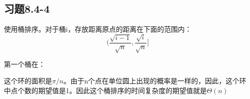 \documentclass[a4paper, 11pt]{article}
\begin{document}
\subsection{习题8.4-4}

使用桶排序。对于桶i，存放距离原点的距离在下面的范围内：
\begin{displaymath}
	(\frac{\sqrt{i - 1}}{\sqrt{n}}, \frac{\sqrt{i}}{\sqrt{n}}]
\end{displaymath}

第一个桶在：
\begin{displaymath}
	[0, \frac{\sqrt{1}}{\sqrt{n}}]
\end{displaymath}

这个环的面积是$\pi/n$。由于n个点在单位圆上出现的概率是一样的，因此，这个环中点个数的期望值是1。因此这个桶排序的时间复杂度的期望值就是$\Theta(n)$
\end{document}
